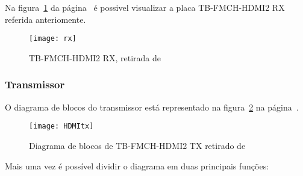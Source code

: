 Na figura~\ref{fig:rx} da página~\pageref{fig:rx} é possivel visualizar a placa TB-FMCH-HDMI2 RX referida anteriomente.
\begin{figure}[h!]
	\begin{center}
		\leavevmode
		\texttt{[image: rx]}
		\caption{TB-FMCH-HDMI2 RX, retirada de \cite{R009}}
		\label{fig:rx}
	\end{center}
\end{figure}

\subsubsection{Transmissor}\label{subsubsec:RX} 
O diagrama de blocos do transmissor está representado na figura~\ref{fig:HDMIblocosTX} na página~\pageref{fig:HDMIblocosTX}.
\begin{figure}[h!]
	\begin{center}
		\leavevmode
		\texttt{[image: HDMItx]}
		\caption{Diagrama de blocos de TB-FMCH-HDMI2 TX retirado de \cite{R009}}
		\label{fig:HDMIblocosTX}
	\end{center}
\end{figure}
Mais uma vez é possível dividir o diagrama em duas principais funções:

